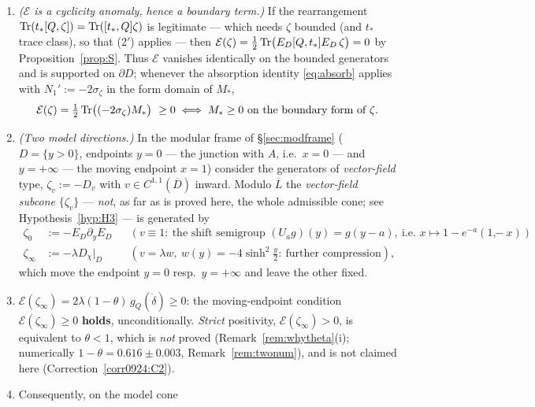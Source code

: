 \documentclass[11pt]{article}
\begin{document}
\begin{proposition}
\begin{enumerate}[leftmargin=1.6em,itemsep=1pt]
{ blocks \eqref{eq:Ablocks}} (or, equivalently, on the boundary form \eqref{eq:Ebdry}: the
 two agree to $2\cdot10^{-10}$--$7.5\cdot10^{-8}$, F2 T5; Correction~\ref{corr0924:C7}).
\item \emph{($\mathcal E$ is a cyclicity anomaly, hence a boundary term.)}  If the
 rearrangement $\operatorname{Tr}(t_*[Q,\zeta])=\operatorname{Tr}([t_*,Q]\zeta)$ is legitimate --- which needs $\zeta$
 bounded (and $t_*$ trace class), so that (2$'$) applies --- then
 $\mathcal E(\zeta)=\frac12\operatorname{Tr}\bigl(E_D[Q,t_*]E_D\,\zeta\bigr)=0$
 by Proposition~\ref{prop:S}.  Thus $\mathcal E$ vanishes identically on the bounded
 generators and is supported on $\partial D$; whenever the absorption identity
 \eqref{eq:absorb} applies with $N_1':=-2\sigma_\zeta$ in the form domain of $M_*$,
 \begin{equation}\label{eq:Ebdry}
  \mathcal E(\zeta)=\tfrac12\operatorname{Tr}\bigl((-2\sigma_\zeta)M_*\bigr)\ \ge0\iff
  \text{$M_*\ge0$ on the boundary form of $\zeta$}.
 \end{equation}
\item \emph{(Two model directions.)}  In the modular frame of \S\ref{sec:modframe}
 ($D=\{y>0\}$, endpoints $y=0$ --- the junction with $A$, i.e.\ $x=0$ --- and $y=+\infty$
 --- the moving endpoint $x=1$) consider the generators of \emph{vector-field} type, $\zeta_v:=-D_v$ with
 $v\in C^{1,1}(\overline D)$ inward.  Modulo $\overline L$ the \emph{vector-field subcone}
 $\{\zeta_v\}$ --- \emph{not}, as far as is proved here, the whole admissible cone; see
 Hypothesis~\ref{hyp:H3} --- is generated by
 \begin{align}
  \zeta_0&:=-E_D\partial_yE_D && (v\equiv1:\ \text{the shift semigroup } (U_ag)(y)=g(y-a),
   \ \text{i.e.\ } x\mapsto1-e^{-a}(1-x)), \label{eq:z0}\\
  \zeta_\infty&:=-\lambda D_\chi|_D && (v=\lambda w,\ w(y)=-4\sinh^2\tfrac y2:\ \text{further
   compression}), \label{eq:zinf}
 \end{align}
 which move the endpoint $y=0$ resp.\ $y=+\infty$ and leave the other fixed.
\item $\mathcal E(\zeta_\infty)=2\lambda(1-\theta)\,g_Q(\dot\delta)\ge0$: the moving-endpoint
 condition $\mathcal E(\zeta_\infty)\ge0$ \textbf{holds}, unconditionally.  \emph{Strict} positivity, $\mathcal E(\zeta_\infty)>0$, is equivalent to $\theta<1$, which is \emph{not} proved (Remark~\ref{rem:whytheta}(i); numerically $1-\theta=0.616\pm0.003$, Remark~\ref{rem:twonum}), and is not claimed here (Correction~\ref{corr0924:C2}).
\item Consequently, on the model cone

\end{enumerate}
\end{proposition}
\end{document}
